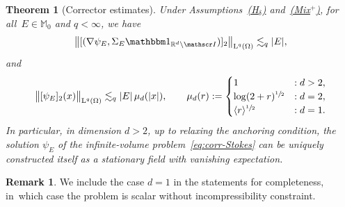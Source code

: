 \documentclass[10pt]{amsart}
\let\mathcal\mathscr
\newcommand{\Hd}{\hyperref[Hd]{\textup{(H$_\delta$)}}\xspace}
\newcommand{\Mix}{\hyperref[Mix+]{\textup{(Mix$^+$)}}\xspace}
\let\mathds\mathbbm
\theoremstyle{plain}
\newtheorem{theor1}{Theorem}
\theoremstyle{definition}
\newtheorem{rem}[theor]{Remark}
\newcommand{\R}{\mathbb R}
\newcommand{\Ic}{\mathcal I}
\newcommand{\Md}{\mathbb M}
\newcommand{\Ld}{\operatorname{L}}
\begin{document}
\begin{theor1}[Corrector estimates]\label{th:cor}
Under Assumptions~\Hd and~\Mix, for all~$E\in\Md_0$ and $q<\infty$, we have
\begin{equation*}\label{eq:bnd-grad-cor}
\bigl\|[(\nabla\psi_E,\Sigma_E\mathds1_{\R^d\setminus\Ic})]_2\bigr\|_{\Ld^q(\Omega)}\lesssim_q |E|,
\end{equation*}
and
\begin{equation}\label{eq:bnd-cor}
\bigl\|[\psi_E]_2(x)\bigr\|_{\Ld^q(\Omega)}\lesssim_q |E|\,\mu_d(|x|),\qquad\mu_d(r):=\begin{cases}
1&:d>2,\\
\log(2+r)^{\sfrac12}&:d=2,\\
\langle r\rangle^{\sfrac12}&:d=1.
\end{cases}
\end{equation}
In particular, in dimension $d>2$, up to relaxing the anchoring condition, the solution $\psi_E$ of the infinite-volume problem~\eqref{eq:corr-Stokes} can be uniquely constructed itself as a stationary field with vanishing expectation.
\end{theor1}
\begin{rem}
We include the case $d=1$ in the statements for completeness, in~which case the problem is scalar without incompressibility constraint.
\end{rem}
\end{document}
